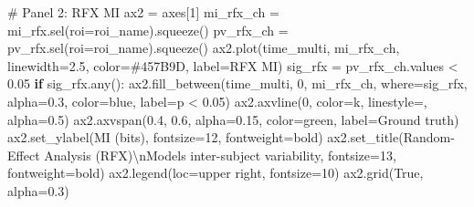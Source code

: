 \documentclass[
  11pt,
  letterpaper,
  oneside,
  openany]{book}
\newenvironment{Shaded}{\begin{snugshade}}{\end{snugshade}}
\newcommand{\BuiltInTok}[1]{\textcolor[rgb]{0.00,0.23,0.31}{#1}}
\newcommand{\CharTok}[1]{\textcolor[rgb]{0.13,0.47,0.30}{#1}}
\newcommand{\CommentTok}[1]{\textcolor[rgb]{0.37,0.37,0.37}{#1}}
\newcommand{\ControlFlowTok}[1]{\textcolor[rgb]{0.00,0.23,0.31}{\textbf{#1}}}
\newcommand{\DecValTok}[1]{\textcolor[rgb]{0.68,0.00,0.00}{#1}}
\newcommand{\FloatTok}[1]{\textcolor[rgb]{0.68,0.00,0.00}{#1}}
\newcommand{\NormalTok}[1]{\textcolor[rgb]{0.00,0.23,0.31}{#1}}
\newcommand{\OperatorTok}[1]{\textcolor[rgb]{0.37,0.37,0.37}{#1}}
\newcommand{\StringTok}[1]{\textcolor[rgb]{0.13,0.47,0.30}{#1}}
\newcommand{\VariableTok}[1]{\textcolor[rgb]{0.07,0.07,0.07}{#1}}
\begin{document}
\begin{Shaded}
\begin{Highlighting}[]
\CommentTok{\# Panel 2: RFX MI}
\NormalTok{ax2 }\OperatorTok{=}\NormalTok{ axes[}\DecValTok{1}\NormalTok{]}
\NormalTok{mi\_rfx\_ch }\OperatorTok{=}\NormalTok{ mi\_rfx.sel(roi}\OperatorTok{=}\NormalTok{roi\_name).squeeze()}
\NormalTok{pv\_rfx\_ch }\OperatorTok{=}\NormalTok{ pv\_rfx.sel(roi}\OperatorTok{=}\NormalTok{roi\_name).squeeze()}
\NormalTok{ax2.plot(time\_multi, mi\_rfx\_ch, linewidth}\OperatorTok{=}\FloatTok{2.5}\NormalTok{, color}\OperatorTok{=}\StringTok{\textquotesingle{}\#457B9D\textquotesingle{}}\NormalTok{, label}\OperatorTok{=}\StringTok{\textquotesingle{}RFX MI\textquotesingle{}}\NormalTok{)}
\NormalTok{sig\_rfx }\OperatorTok{=}\NormalTok{ pv\_rfx\_ch.values }\OperatorTok{\textless{}} \FloatTok{0.05}
\ControlFlowTok{if}\NormalTok{ sig\_rfx.}\BuiltInTok{any}\NormalTok{():}
\NormalTok{    ax2.fill\_between(time\_multi, }\DecValTok{0}\NormalTok{, mi\_rfx\_ch, where}\OperatorTok{=}\NormalTok{sig\_rfx,}
\NormalTok{                     alpha}\OperatorTok{=}\FloatTok{0.3}\NormalTok{, color}\OperatorTok{=}\StringTok{\textquotesingle{}blue\textquotesingle{}}\NormalTok{, label}\OperatorTok{=}\StringTok{\textquotesingle{}p \textless{} 0.05\textquotesingle{}}\NormalTok{)}
\NormalTok{ax2.axvline(}\DecValTok{0}\NormalTok{, color}\OperatorTok{=}\StringTok{\textquotesingle{}k\textquotesingle{}}\NormalTok{, linestyle}\OperatorTok{=}\StringTok{\textquotesingle{}{-}{-}\textquotesingle{}}\NormalTok{, alpha}\OperatorTok{=}\FloatTok{0.5}\NormalTok{)}
\NormalTok{ax2.axvspan(}\FloatTok{0.4}\NormalTok{, }\FloatTok{0.6}\NormalTok{, alpha}\OperatorTok{=}\FloatTok{0.15}\NormalTok{, color}\OperatorTok{=}\StringTok{\textquotesingle{}green\textquotesingle{}}\NormalTok{, label}\OperatorTok{=}\StringTok{\textquotesingle{}Ground truth\textquotesingle{}}\NormalTok{)}
\NormalTok{ax2.set\_ylabel(}\StringTok{\textquotesingle{}MI (bits)\textquotesingle{}}\NormalTok{, fontsize}\OperatorTok{=}\DecValTok{12}\NormalTok{, fontweight}\OperatorTok{=}\StringTok{\textquotesingle{}bold\textquotesingle{}}\NormalTok{)}
\NormalTok{ax2.set\_title(}\StringTok{\textquotesingle{}Random{-}Effect Analysis (RFX)}\CharTok{\textbackslash{}n}\StringTok{Models inter{-}subject variability\textquotesingle{}}\NormalTok{, }
\NormalTok{              fontsize}\OperatorTok{=}\DecValTok{13}\NormalTok{, fontweight}\OperatorTok{=}\StringTok{\textquotesingle{}bold\textquotesingle{}}\NormalTok{)}
\NormalTok{ax2.legend(loc}\OperatorTok{=}\StringTok{\textquotesingle{}upper right\textquotesingle{}}\NormalTok{, fontsize}\OperatorTok{=}\DecValTok{10}\NormalTok{)}
\NormalTok{ax2.grid(}\VariableTok{True}\NormalTok{, alpha}\OperatorTok{=}\FloatTok{0.3}\NormalTok{)}


\end{Highlighting}
\end{Shaded}
\end{document}
